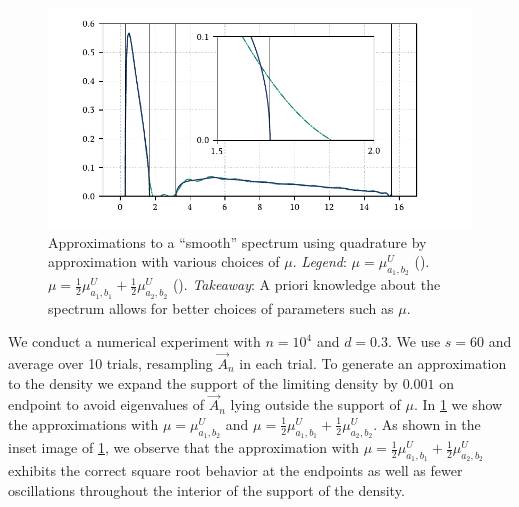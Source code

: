\begin{figure}[htb]
    \includegraphics[width=\textwidth]{imgs/ch4_RM_split_AQ.pdf}
    \caption[{Approximations to a ``smooth'' spectrum using quadrature by approximation with various choices of \( \mu \).}]{%
        Approximations to a ``smooth'' spectrum using quadrature by approximation with various choices of \( \mu \).
        \hspace{.25em}\emph{Legend}:
        \( \mu = \mu_{a_1,b_2}^U \) 
        ({\protect{}}).
        \( \mu = \frac{1}{2} \mu_{a_1,b_1}^U + \frac{1}{2} \mu_{a_2,b_2}^U \)
        ({\protect{}}).
        \hspace{.25em}\emph{Takeaway}: A priori knowledge about the spectrum allows for better choices of parameters such as \( \mu \). 
    }
    \label{fig:RM_split_AQ}
\end{figure}

We conduct a numerical experiment with \( n = 10^4 \) and \( d=0.3 \).
We use \( s=60 \) and average over 10 trials, resampling \( \vec{A}_n \) in each trial.
To generate an approximation to the density we expand the support of the limiting density by \( 0.001 \) on endpoint to avoid eigenvalues of \( \vec{A}_n \) lying outside the support of \( \mu \).
In \cref{fig:RM_split_AQ} we show the approximations with \( \mu = \mu_{a_1,b_2}^U \) and \( \mu = \frac{1}{2} \mu_{a_1,b_1}^U + \frac{1}{2} \mu_{a_2,b_2}^U \).
As shown in the inset image of \cref{fig:RM_split_AQ}, we observe that the approximation with \( \mu = \frac{1}{2} \mu_{a_1,b_1}^U + \frac{1}{2} \mu_{a_2,b_2}^U \) exhibits the correct square root behavior at the endpoints as well as fewer oscillations throughout the interior of the support of the density.


